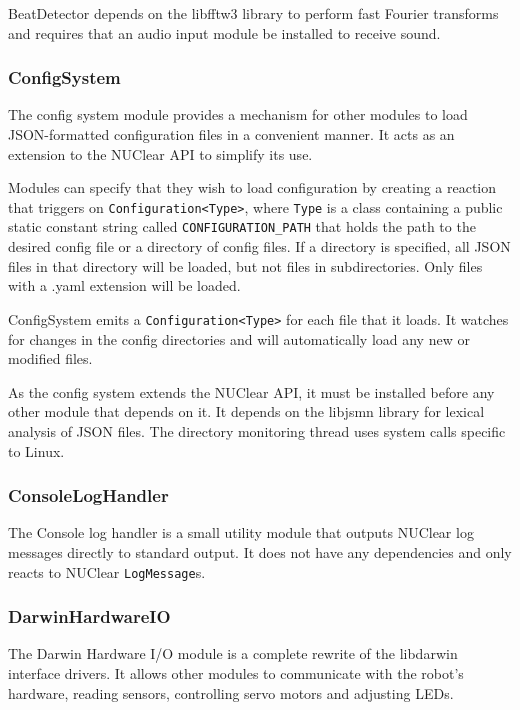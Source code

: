 \documentclass[english,12pt]{scrartcl}
\begin{document}
				BeatDetector depends on the libfftw3 library to perform fast Fourier transforms
				and requires that an audio input module be installed to receive sound.


			\subsubsection{ConfigSystem}
				The config system module provides a mechanism for other modules to load
				JSON-formatted configuration files in a convenient manner. It acts as an
				extension to the NUClear API to simplify its use.

				Modules can specify that they wish to load configuration by creating a reaction
				that triggers on \texttt{Configuration<Type>}, where \texttt{Type} is a class
				containing a public static constant string called \texttt{CONFIGURATION\_PATH}
				that holds the path	to the desired config file or a directory of config files. If
				a directory is specified, all JSON files in that directory will be loaded, but
				not files in subdirectories. Only files with a .yaml extension will be loaded.

				ConfigSystem emits a \texttt{Configuration<Type>} for each file that it loads. It
				watches for changes in the config directories and will automatically load any new
				or modified files.

				As the config system extends the NUClear API, it must be installed before any
				other module that depends on it. It depends on the libjsmn library for lexical
				analysis of JSON files. The directory monitoring thread uses system calls
				specific to Linux.


			\subsubsection{ConsoleLogHandler}
				The Console log handler is a small utility module that outputs NUClear log
				messages directly to standard output. It does not have any dependencies and
				only reacts to NUClear \texttt{LogMessage}s.


			\subsubsection{DarwinHardwareIO}
				The Darwin Hardware I/O module is a complete rewrite of the libdarwin interface
				drivers. It allows other modules to communicate with the robot's hardware, reading
				sensors, controlling servo motors and adjusting LEDs.
\end{document}
